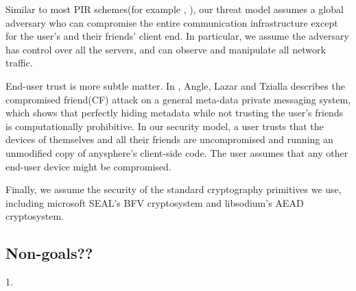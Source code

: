 

Similar to most PIR schemes(for example \cite{ahmad2021addra}, ), our threat model assumes a global adversary who can compromise the entire communication infrastructure except for the user's and their friends' client end. In particular, we assume the adversary has control over all the servers, and can observe and manipulate all network traffic.

End-user trust is more subtle matter. In \cite{angel2018s}, Angle, Lazar and Tzialla describes the compromised friend(CF) attack on a general meta-data private messaging system, which shows that perfectly hiding metadata while not trusting the user's friends is computationally prohibitive. In our security model, a user trusts that the devices of themselves and all their friends are uncompromised and running an unmodified copy of anysphere's client-side code. The user assumes that any other end-user device might be compromised.


Finally, we assume the security of the standard cryptography primitives we use, including microsoft SEAL's BFV cryptosystem and libsodium's AEAD cryptosystem. 



\subsection{Non-goals??}
1. 


